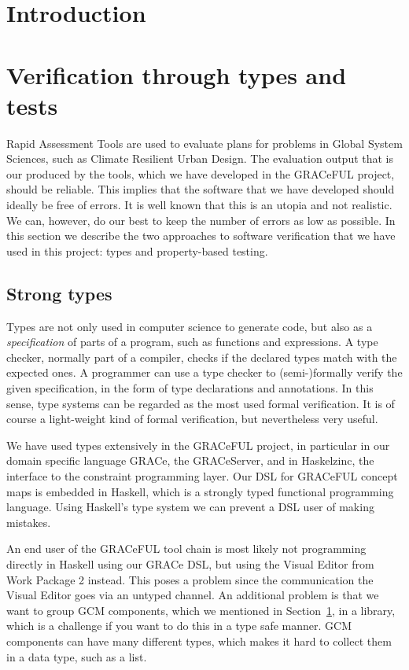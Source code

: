 \documentclass{article}
\begin{document}
\section{Introduction}
\label{sec:intro}




\section{Verification through types and tests}

Rapid Assessment Tools are used to evaluate plans for problems in Global System
Sciences, such as Climate Resilient Urban Design. The evaluation output that is
our produced by the tools, which we have developed in the GRACeFUL project,
should be reliable. This implies that the software that we have developed should
ideally be free of errors. It is well known that this is an utopia and not
realistic. We can, however, do our best to keep the number of errors as low as
possible. In this section we describe the two approaches to software
verification that we have used in this project: types and property-based
testing. 

\subsection{Strong types}

Types are not only used in computer science to generate code, but also as a
\emph{specification} of parts of a program, such as functions and expressions. A
type checker, normally part of a compiler, checks if the declared types match
with the expected ones. A programmer can use a type checker to (semi-)formally
verify the given specification, in the form of type declarations and
annotations. In this sense, type systems can be regarded as the most used
formal verification. It is of course a light-weight kind of formal verification,
but nevertheless very useful. 

We have used types extensively in the GRACeFUL project, in particular in our
domain specific language GRACe, the GRACeServer, and in Haskelzinc, the
interface to the constraint programming layer. Our DSL for GRACeFUL concept maps
is embedded in Haskell, which is a strongly typed functional programming
language. Using Haskell's type system we can prevent a DSL user of making
mistakes.

An end user of the GRACeFUL tool chain is most likely not programming directly
in Haskell using our GRACe DSL, but using the Visual Editor from Work Package 2
instead. This poses a problem since the communication the Visual Editor goes via
an untyped channel. An additional problem is that we want to group GCM
components, which we mentioned in Section~\ref{sec:intro}, in a library, which
is a challenge if you want to do this in a type safe manner. GCM components can
have many different types, which makes it hard to collect them in a data type,
such as a list.
\end{document}
